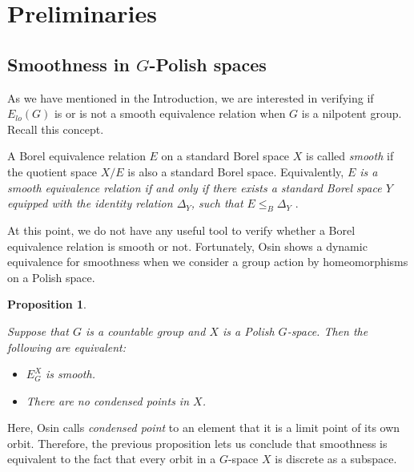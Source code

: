 \documentclass[12pt]{article}
\newtheorem{prop}{Proposition}
\theoremstyle{definition}
\begin{document}
\section{Preliminaries}

\subsection{Smoothness in $G$-Polish spaces}

As we have mentioned in the Introduction, we are interested in verifying if $E_{lo}(G)$ is or is not a smooth equivalence relation when $G$ is a nilpotent group. Recall this concept. 

A Borel equivalence relation $E$ on a standard Borel space $X$ is called {\it smooth} if the quotient space $X/E$ is also a standard Borel space. Equivalently, {\it $E$ is a smooth equivalence relation if and only if there exists a standard Borel space $Y$ equipped with the identity relation $\Delta_Y$, such that $E\leq_B\Delta_Y$} \cite{ClayCalderoni1}.

At this point, we do not have any useful tool to verify whether a Borel equivalence relation is smooth or not. Fortunately, Osin shows a dynamic equivalence for smoothness when we consider a group action by homeomorphisms on a Polish space.

\begin{prop}\cite[Proposition 2.7]{Osin}
\label{condpoint}
    {\it Suppose that $G$ is a countable group and $X$ is a Polish $G$-space. Then the following are equivalent:
\begin{itemize}
    \item[(1)] $E_{G}^X$ is smooth.
    \item[(2)] There are no condensed points in $X$.
\end{itemize}}
\end{prop}
Here, Osin calls {\it condensed point} to an element that it is a limit point of its own orbit. Therefore, the previous proposition lets us conclude that smoothness is equivalent to the fact that every orbit in a $G$-space $X$ is discrete as a subspace.\\
\end{document}
